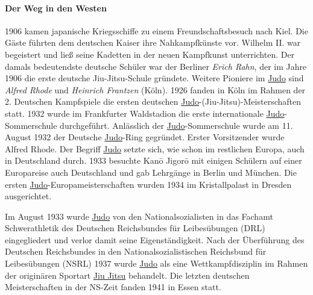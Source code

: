\documentclass[justified, a4paper, notitlepage, captions=tableheading, nobib]{tufte-handout}
\begin{document}
\paragraph{Der Weg in den Westen}
\label{sec:org65a4199}
1906 kamen japanische Kriegsschiffe zu einem Freundschaftsbesuch nach Kiel. Die Gäste führten dem deutschen Kaiser ihre Nahkampfkünste vor. Wilhelm II. war begeistert und ließ seine Kadetten in der neuen Kampfkunst unterrichten. Der damals bedeutendste deutsche Schüler war der Berliner \emph{Erich Rahn}, der im Jahre 1906 die erste deutsche Jiu-Jitsu-Schule gründete. Weitere Pioniere im \hyperref[org80c3996]{Judo} sind \emph{Alfred Rhode} und \emph{Heinrich Frantzen} (Köln). 1926 fanden in Köln im Rahmen der 2. Deutschen Kampfspiele die ersten deutschen \hyperref[org80c3996]{Judo}-(Jiu-Jitsu)-Meisterschaften statt. 1932 wurde im Frankfurter Waldstadion die erste internationale \hyperref[org80c3996]{Judo}-Sommerschule durchgeführt. Anlässlich der \hyperref[org80c3996]{Judo}-Sommerschule wurde am 11. August 1932 der Deutsche \hyperref[org80c3996]{Judo}-Ring gegründet. Erster Vorsitzender wurde Alfred Rhode. Der Begriff \hyperref[org80c3996]{Judo} setzte sich, wie schon im restlichen Europa, auch in Deutschland durch. 1933 besuchte Kanō Jigorō mit einigen Schülern auf einer Europareise auch Deutschland und gab Lehrgänge in Berlin und München. Die ersten \hyperref[org80c3996]{Judo}-Europameisterschaften wurden 1934 im Kristallpalast in Dresden ausgerichtet.

Im August 1933 wurde \hyperref[org80c3996]{Judo} von den Nationalsozialisten in das Fachamt Schwerathletik des Deutschen Reichsbundes für Leibesübungen (DRL) eingegliedert und verlor damit seine Eigenständigkeit. Nach der Überführung des Deutschen Reichsbundes in den Nationalsozialistischen Reichsbund für Leibesübungen (NSRL) 1937 wurde \hyperref[org80c3996]{Judo} als eine Wettkampfdisziplin im Rahmen der originären Sportart \hyperref[org15c89c5]{Jiu Jitsu} behandelt. Die letzten deutschen Meisterschaften in der NS-Zeit fanden 1941 in Essen statt.
\end{document}
